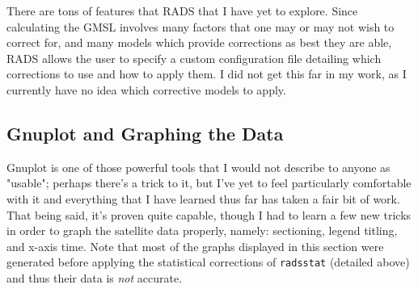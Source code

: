 \documentclass{article}
\begin{document}
There are tons of features that RADS that I have yet to explore.  Since calculating the GMSL involves many factors that one may or may not wish to correct for, and many models which provide corrections as best they are able, RADS allows the user to specify a custom configuration file detailing which corrections to use and how to apply them.  I did not get this far in my work, as I currently have no idea which corrective models to apply.

\subsection{Gnuplot and Graphing the Data}
Gnuplot is one of those powerful tools that I would not describe to anyone as "usable"; perhaps there's a trick to it, but I've yet to feel particularly comfortable with it and everything that I have learned thus far has taken a fair bit of work.  That being said, it's proven quite capable, though I had to learn a few new tricks in order to graph the satellite data properly, namely: sectioning, legend titling, and x-axis time.  Note that most of the graphs displayed in this section were generated before applying the statistical corrections of \texttt{radsstat} (detailed above) and thus their data is \emph{not} accurate.
\end{document}
